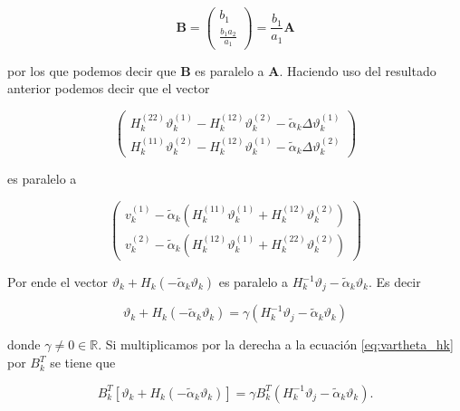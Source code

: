 \begin{equation*}
    \boldsymbol{B} = \begin{pmatrix}
        b_1 \\
        \frac{b_1a_2}{a_1}
    \end{pmatrix} = \frac{b_1}{a_1}\boldsymbol{A}
\end{equation*}

por los que podemos decir que $\boldsymbol{B}$ es paralelo a $\boldsymbol{A}$. Haciendo uso del resultado anterior podemos decir que el vector

\begin{equation*}
    \begin{pmatrix}
        H_k^{(22)}\vartheta_k^{(1)}-H_k^{(12)}\vartheta_k^{(2)}-\tilde{\alpha}_k\Delta\vartheta_k^{(1)} \\[0.25cm]
        H_k^{(11)}\vartheta_k^{(2)}-H_k^{(12)}\vartheta_k^{(1)}-\tilde{\alpha}_k\Delta\vartheta_k^{(2)}
    \end{pmatrix}
\end{equation*}

es paralelo a

\begin{equation*}
    \begin{pmatrix}
        v_k^{(1)} - \tilde{\alpha}_k(H_k^{(11)}\vartheta_k^{(1)}+H_k^{(12)}\vartheta_k^{(2)}) \\[0.25cm]
        v_k^{(2)} - \tilde{\alpha}_k(H_k^{(12)}\vartheta_k^{(1)}+H_k^{(22)}\vartheta_k^{(2)})
    \end{pmatrix}
\end{equation*}

Por ende el vector $\vartheta_k+H_k(-\tilde{\alpha}_k\vartheta_k)$ es paralelo a  $H_k^{-1}\vartheta_j-\tilde{\alpha}_k\vartheta_k$. Es decir

\begin{equation}
    \vartheta_k+H_k(-\tilde{\alpha}_k\vartheta_k) = \gamma(H_k^{-1}\vartheta_j-\tilde{\alpha}_k\vartheta_k) \label{eq:vartheta_hk}
\end{equation}

donde $\gamma\neq 0  \in \mathbb{R}$. Si multiplicamos por la derecha a la ecuación \ref{eq:vartheta_hk} por $B_k^T$ se tiene que

\begin{equation*}
    B_k^T[\vartheta_k+H_k(-\tilde{\alpha}_k\vartheta_k)] = \gamma B_k^T(H_k^{-1}\vartheta_j-\tilde{\alpha}_k\vartheta_k).
\end{equation*}

